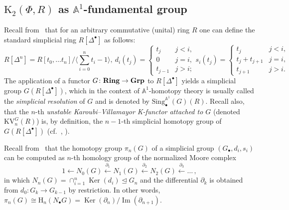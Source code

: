 \documentclass[oneside, 11pt]{amsart} \pdfoutput=1
\renewcommand{\Im}{\mathop{\mathrm{Im}}\nolimits}
\newcommand{\Ker}{\mathop{\mathrm{Ker}}\nolimits}
\newcommand{\K}{{\mathrm{K}}}
\numberwithin{equation}{section}
\theoremstyle{definition}
\newcommand{\catname}[1]{{\normalfont\textbf{#1}}} %
\begin{document}
\subsection{\texorpdfstring{$\K_2(\Phi, R)$}{K2(R)} as $\mathbb{A}^1$-fundamental group} \label{sec:K2-as-pi-1}
Recall from~\cite{Jar83} that for an arbitrary commutative (unital) ring $R$ one can define the standard simplicial ring $R[\Delta^\bullet]$ as follows:
\begin{equation}
 R[\Delta^n] = R[t_0,\ldots t_n]/\langle \sum_{i=0}^n t_i -1 \rangle,\ d_i(t_j) = \left\{ \begin{array}{ll}t_j & j < i, \\0 & j = i, \\ t_{j-1} & j > i; \end{array}\right. s_i(t_j) = \left\{ \begin{array}{ll} t_j & j < i, \\ t_j + t_{j+1} & j = i, \\ t_{j+1} & j > i. \end{array} \right.
\end{equation}
	The application of a functor $G\colon\catname{Ring}\rightarrow\catname{Grp}$ to $R[\Delta^\bullet]$ yields a simplicial group $G(R[\Delta^\bullet])$, which in the context of $\mathbb{A}^1$-homotopy theory is usually called the {\it simplicial resolution} of $G$ and is denoted by $\mathrm{Sing}^{\mathbb{A}^1}_\bullet(G)(R)$. Recall also, that the $n$-th {\it unstable Karoubi--Villamayor K-functor attached to $G$} (denoted $\mathrm{KV}^G_n(R)$) is, by definition, the $n-1$-th simplicial homotopy group of $G(R[\Delta^\bullet])$ (cf.~\cite[\S~4.3]{AHW18}, \cite[\S~3]{Jar83}).

Recall from~\cite[\S~17]{May67} that the homotopy group $\pi_n(G)$ of a simplicial group $(G_\bullet, d_i, s_i)$ can be computed as $n$-th homology group of the normalized Moore complex
\[ 1 \leftarrow N_0(G) \xleftarrow{\partial_1} N_1(G) \xleftarrow{\partial_2} N_2(G) \xleftarrow{\partial_3} \ldots\,, \]
in which $N_n(G) = \cap_{i=1}^n\Ker(d_i) \trianglelefteq G_n$ and the differential $\partial_k$ is obtained from $d_0\colon G_k \to G_{k-1}$ by restriction. In other words, $\pi_n(G) \cong \mathrm{H}_n(N_\bullet G) = \Ker(\partial_n) / \Im(\partial_{n+1})$.
\end{document}

